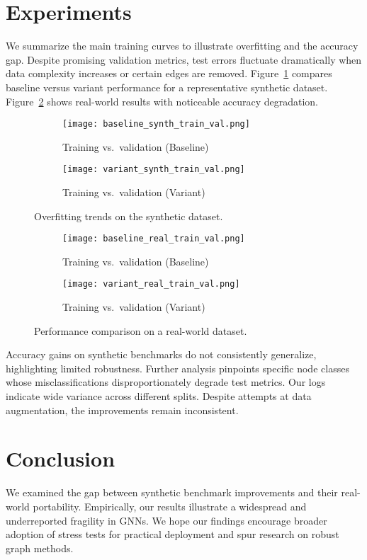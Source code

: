 \documentclass{article}
\begin{document}
\section{Experiments}
We summarize the main training curves to illustrate overfitting and the accuracy gap. Despite promising validation metrics, test errors fluctuate dramatically when data complexity increases or certain edges are removed. Figure~\ref{fig:main1} compares baseline versus variant performance for a representative synthetic dataset. Figure~\ref{fig:main2} shows real-world results with noticeable accuracy degradation.

\begin{figure}[!h]
\centering
\begin{subfigure}{0.45\linewidth}
\centering
\texttt{[image: baseline\_synth\_train\_val.png]}
\caption{Training vs.\ validation (Baseline)}
\end{subfigure}
\hfill
\begin{subfigure}{0.45\linewidth}
\centering
\texttt{[image: variant\_synth\_train\_val.png]}
\caption{Training vs.\ validation (Variant)}
\end{subfigure}
\caption{Overfitting trends on the synthetic dataset.}
\label{fig:main1}
\end{figure}

\begin{figure}[!h]
\centering
\begin{subfigure}{0.45\linewidth}
\centering
\texttt{[image: baseline\_real\_train\_val.png]}
\caption{Training vs.\ validation (Baseline)}
\end{subfigure}
\hfill
\begin{subfigure}{0.45\linewidth}
\centering
\texttt{[image: variant\_real\_train\_val.png]}
\caption{Training vs.\ validation (Variant)}
\end{subfigure}
\caption{Performance comparison on a real-world dataset.}
\label{fig:main2}
\end{figure}

Accuracy gains on synthetic benchmarks do not consistently generalize, highlighting limited robustness. Further analysis pinpoints specific node classes whose misclassifications disproportionately degrade test metrics. Our logs indicate wide variance across different splits. Despite attempts at data augmentation, the improvements remain inconsistent.

\section{Conclusion}
We examined the gap between synthetic benchmark improvements and their real-world portability. Empirically, our results illustrate a widespread and underreported fragility in GNNs. We hope our findings encourage broader adoption of stress tests for practical deployment and spur research on robust graph methods.
\end{document}
